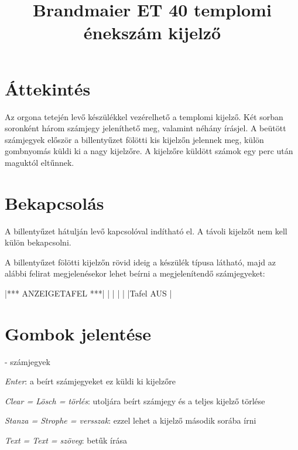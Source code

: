 \documentclass{article}
\begin{document}

\title{Brandmaier ET 40 templomi énekszám kijelző}
\date{}

\setlength{\droptitle}{-3cm}
\maketitle

\section*{Áttekintés}

Az orgona tetején levő készülékkel vezérelhető a templomi kijelző. Két sorban soronként három számjegy jeleníthető meg, valamint néhány írásjel. A beütött számjegyek először a billentyűzet fölötti kis kijelzőn jelennek meg, külön gombnyomás küldi ki a nagy kijelzőre. A kijelzőre küldött számok egy perc után maguktól eltűnnek.

\section*{Bekapcsolás}

A billentyűzet hátulján levő kapcsolóval indítható el. A távoli kijelzőt nem kell külön bekapcsolni.



A billentyűzet fölötti kijelzőn rövid ideig a készülék típusa látható, majd az alábbi felirat megjelenésekor lehet beírni a megjelenítendő számjegyeket:

\setlength\LCDunitlength{0.3mm}
|*** ANZEIGETAFEL ***|
|                    |
|                    |
|Tafel AUS           |
\setlength\LCDunitlength{0.6mm}

\section*{Gombok jelentése}

- számjegyek

\keys{ } \emph{Enter}: a beírt számjegyeket ez küldi ki kijelzőre

 \emph{Clear = Lösch = törlés}: utoljára beírt számjegy és a teljes kijelző törlése

 \emph{Stanza = Strophe = versszak}: ezzel lehet a kijelző második sorába írni

 \emph{Text = Text = szöveg}: betűk írása
\end{document}
